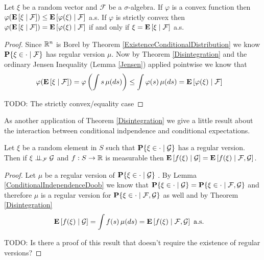 \begin{thm}\label{JensenConditionalExpectation}Let $\xi$ be a random vector and $\mathcal{F}$ be a
  $\sigma$-algebra.  If $\varphi$ is a convex function then
  $\varphi(\cexpectationlong{\mathcal{F}}{\xi}) \leq
    \cexpectationlong{\mathcal{F}}{\varphi(\xi)}$ a.s.
If $\varphi$ is strictly convex then $\varphi(\cexpectationlong{\mathcal{F}}{\xi}) =
    \cexpectationlong{\mathcal{F}}{\varphi(\xi)}$ if and only if $\xi =
      \cexpectationlong{\mathcal{F}}{\xi}$ a.s.
\end{thm}
\begin{proof}
Since $\reals^n$ is Borel by Theorem
\ref{ExistenceConditionalDistribution} we know
$\cprobability{\mathcal{F}}{\xi \in \cdot}$ has regular version
$\mu$.  Now by Theorem \ref{Disintegration} and the ordinary Jensen
Inequality (Lemma \ref{Jensen}) applied pointwise we know that 
\begin{align*}
\varphi(\cexpectationlong{\mathcal{F}}{\xi}) &= 
\varphi \left( \int s \, \mu(ds) \right) \leq \int \varphi (s)
\, \mu(ds) = \cexpectationlong{\mathcal{F}}{\varphi(\xi)}
\end{align*}

TODO: The strictly convex/equality case
\end{proof}

As another application of Theorem \ref{Disintegration} we give a
little result about the interaction between conditional indpendence
and conditional expectations.
\begin{cor}Let $\xi$ be a random element in $S$ such that
  $\cprobability{\mathcal{G}}{\xi  \in \cdot}$
has a regular version.  Then if
$\cindependent{\xi}{\mathcal{G}}{\mathcal{F}}$ and $f : S \to \reals$ is
measurable then
$\cexpectationlong{\mathcal{G}}{f(\xi)} = \cexpectationlong{\mathcal{F}, \mathcal{G}}{f(\xi)}$.
\end{cor}
\begin{proof}
Let $\mu$ be a regular version of $\cprobability{\mathcal{G}}{\xi  \in
  \cdot}$ .  By Lemma \ref{ConditionalIndependenceDoob} we know that
$\cprobability{\mathcal{G}}{\xi  \in \cdot} =
\cprobability{\mathcal{F}, \mathcal{G}}{\xi  \in \cdot}$ and therefore
$\mu$ is a regular version for $\cprobability{\mathcal{F}, \mathcal{G}}{\xi  \in \cdot}$ as well and
by Theorem \ref{Disintegration}
\begin{align*}
\cexpectationlong{\mathcal{G}}{f(\xi)} &= \int f(s) \, \mu(ds) =
\cexpectationlong{\mathcal{F}, \mathcal{G}}{f(\xi)} \text { a.s.}
\end{align*}

TODO: Is there a proof of this result that doesn't require the
existence of regular versions?
\end{proof}
 
